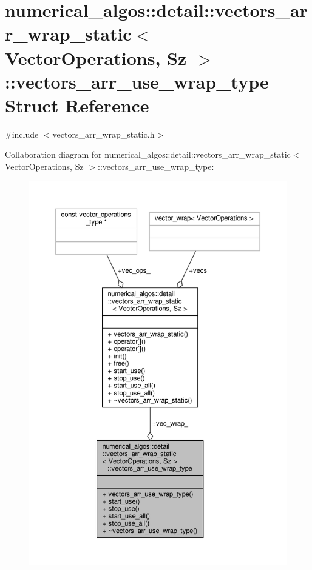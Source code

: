 \hypertarget{structnumerical__algos_1_1detail_1_1vectors__arr__wrap__static_1_1vectors__arr__use__wrap__type}{\section{numerical\-\_\-algos\-:\-:detail\-:\-:vectors\-\_\-arr\-\_\-wrap\-\_\-static$<$ Vector\-Operations, Sz $>$\-:\-:vectors\-\_\-arr\-\_\-use\-\_\-wrap\-\_\-type Struct Reference}
\label{structnumerical__algos_1_1detail_1_1vectors__arr__wrap__static_1_1vectors__arr__use__wrap__type}
}


{\ttfamily \#include $<$vectors\-\_\-arr\-\_\-wrap\-\_\-static.\-h$>$}



Collaboration diagram for numerical\-\_\-algos\-:\-:detail\-:\-:vectors\-\_\-arr\-\_\-wrap\-\_\-static$<$ Vector\-Operations, Sz $>$\-:\-:vectors\-\_\-arr\-\_\-use\-\_\-wrap\-\_\-type\-:
\nopagebreak
\begin{figure}[H]
\begin{center}
\leavevmode
\includegraphics[width=350pt]{structnumerical__algos_1_1detail_1_1vectors__arr__wrap__static_1_1vectors__arr__use__wrap__type__coll__graph}
\end{center}
\end{figure}
